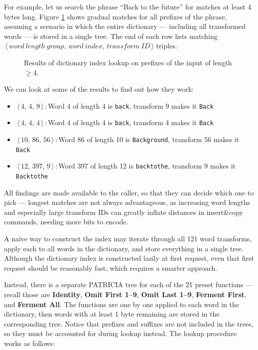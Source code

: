 \documentclass[english,master,dept460,male,cpp,cpdeclaration]{diploma}
\newcommand{\nosep}{\itemsep0em}
\newcommand{\triple}[3]{$\,\langle\,#1,\,#2,\,#3\,\rangle$}
\newcommand{\texfigure}[1]{
}
\begin{document}
			For example, let us search the phrase \enquote{Back to the future} for matches at least 4 bytes long. Figure \ref{fig:dictionary-index-lookup-example} shows gradual matches for all prefixes of the phrase, assuming a scenario in which the entire dictionary --- including all transformed words --- is stored in a single tree. The end of each row lists matching \triple{word\ length\ group}{word\ index}{transform\ ID} triples.
			
			\begin{figure}[H]
				\texfigure{dictionary-index-lookup-example}
				\caption{Results of dictionary index lookup on prefixes of the input of length $\geq 4$.}
				\label{fig:dictionary-index-lookup-example}
			\end{figure}
			
			\noindent
			We can look at some of the results to find out how they work:
			
			\begin{itemize} \nosep
				\item \triple{4}{4}{9}\,:\,Word 4 of length 4 is \verb|back|, transform 9 makes it \verb|Back|
				\item \triple{4}{4}{4}\,:\,Word 4 of length 4 is \verb|back|, transform 4 makes it \texttt{Back\textvisiblespace}
				\item \triple{10}{86}{56}\,:\,Word 86 of length 10 is \verb|Background|, transform 56 makes it \verb|Back|
				\item \triple{12}{397}{9}\,:\,Word 397 of length 12 is \texttt{back\textvisiblespace to\textvisiblespace the\textvisiblespace}, transform 9 makes it  \texttt{Back\textvisiblespace to\textvisiblespace the\textvisiblespace}
			\end{itemize}
			
			\noindent
			All findings are made available to the caller, so that they can decide which one to pick --- longest matches are not always advantageous, as increasing word lengths and especially large transform IDs can greatly inflate distances in insert\&copy commands, needing more bits to encode.
			
			A naïve way to construct the index may iterate through all 121 word transforms, apply each to all words in the dictionary, and store everything in a single tree. Although the dictionary index is constructed lazily at first request, even that first request should be reasonably fast, which requires a smarter approach.
			
			Instead, there is a separate PATRICIA tree for each of the 21 preset functions --- recall those are \textbf{Identity}, \textbf{Omit First 1--9}, \textbf{Omit Last 1--9}, \textbf{Ferment First}, and \textbf{Ferment All}. The functions are one by one applied to each word in the dictionary, then words with at least 1 byte remaining are stored in the corresponding tree. Notice that prefixes and suffixes are not included in the trees, so they must be accounted for during lookup instead. The lookup procedure works as follows:
			
\end{document}
